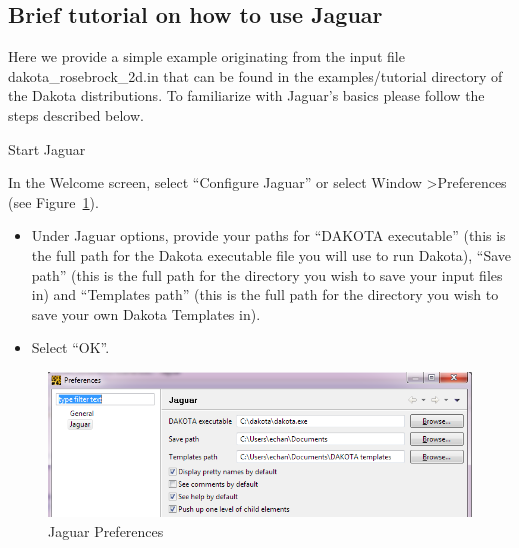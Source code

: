 \newpage
\subsection{Brief tutorial on how to use Jaguar}

Here we provide a simple example originating from the input file dakota\_rosebrock\_2d.in that can be found in the examples/tutorial
directory of the Dakota distributions. To familiarize with Jaguar's basics please follow the steps described below.

Start Jaguar

In the Welcome screen, select ``Configure Jaguar'' or select Window \textgreater Preferences (see Figure~\ref{fig:input:0Preferences}).
\begin{itemize}
\item Under Jaguar options, provide your paths for ``DAKOTA executable'' (this is the full path for the Dakota executable file you will use to run Dakota), ``Save path'' (this is the full path for the directory you wish to save your input files in) and ``Templates path'' (this is the full path for the directory you wish to save your own Dakota Templates in).
\item Select ``OK''.
\end{itemize}
\begin{figure}[htbp]
  \centering
  \includegraphics[scale=0.6]{images/0Preferences}
  \caption{Jaguar Preferences}
  \label{fig:input:0Preferences}
\end{figure}

